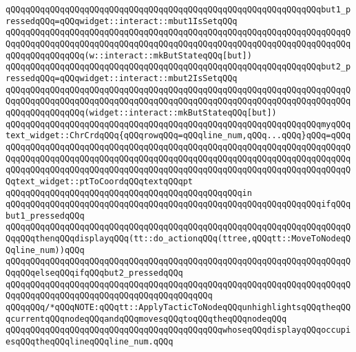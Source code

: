 \newline
\verb|qQQqqQQqqQQqqQQqqQQqqQQqqQQqqQQqqQQqqQQqqQQqqQQqqQQqqQQqqQQqqQQqbut1_pressedqQQq=qQQqwidget::interact::mbut1IsSetqQQq|\newline
\verb|qQQqqQQqqQQqqQQqqQQqqQQqqQQqqQQqqQQqqQQqqQQqqQQqqQQqqQQqqQQqqQQqqQQqqQQqqQQqqQQqqQQqqQQqqQQqqQQqqQQqqQQqqQQqqQQqqQQqqQQqqQQqqQQqqQQqqQQqqQQqqQQqqQQqqQQqqQQq(w::interact::mkButStateqQQq[but])|\newline
\newline
\verb|qQQqqQQqqQQqqQQqqQQqqQQqqQQqqQQqqQQqqQQqqQQqqQQqqQQqqQQqqQQqqQQqbut2_pressedqQQq=qQQqwidget::interact::mbut2IsSetqQQq|\newline
\verb|qQQqqQQqqQQqqQQqqQQqqQQqqQQqqQQqqQQqqQQqqQQqqQQqqQQqqQQqqQQqqQQqqQQqqQQqqQQqqQQqqQQqqQQqqQQqqQQqqQQqqQQqqQQqqQQqqQQqqQQqqQQqqQQqqQQqqQQqqQQqqQQqqQQqqQQqqQQq(widget::interact::mkButStateqQQq[but])|\newline
\newline
\verb|qQQqqQQqqQQqqQQqqQQqqQQqqQQqqQQqqQQqqQQqqQQqqQQqqQQqqQQqqQQqqQQqmyqQQqtext_widget::ChrCrdqQQq{qQQqrowqQQq=qQQqline_num,qQQq...qQQq}qQQq=qQQq|\newline
\verb|qQQqqQQqqQQqqQQqqQQqqQQqqQQqqQQqqQQqqQQqqQQqqQQqqQQqqQQqqQQqqQQqqQQqqQQqqQQqqQQqqQQqqQQqqQQqqQQqqQQqqQQqqQQqqQQqqQQqqQQqqQQqqQQqqQQqqQQqqQQqqQQqqQQqqQQqqQQqqQQqqQQqqQQqqQQqqQQqqQQqqQQqqQQqqQQqqQQqqQQqqQQqqQQqqQQqtext_widget::ptToCoordqQQqtextqQQqpt|\newline
\newline
\verb|qQQqqQQqqQQqqQQqqQQqqQQqqQQqqQQqqQQqqQQqqQQqqQQqin|\newline
\verb|qQQqqQQqqQQqqQQqqQQqqQQqqQQqqQQqqQQqqQQqqQQqqQQqqQQqqQQqqQQqqQQqifqQQqbut1_pressedqQQq|\newline
\verb|qQQqqQQqqQQqqQQqqQQqqQQqqQQqqQQqqQQqqQQqqQQqqQQqqQQqqQQqqQQqqQQqqQQqqQQqqQQqthenqQQqdisplayqQQq(tt::do_actionqQQq(ttree,qQQqtt::MoveToNodeqQQqline_num))qQQq|\newline
\verb|qQQqqQQqqQQqqQQqqQQqqQQqqQQqqQQqqQQqqQQqqQQqqQQqqQQqqQQqqQQqqQQqqQQqqQQqqQQqelseqQQqifqQQqbut2_pressedqQQq|\newline
\verb|qQQqqQQqqQQqqQQqqQQqqQQqqQQqqQQqqQQqqQQqqQQqqQQqqQQqqQQqqQQqqQQqqQQqqQQqqQQqqQQqqQQqqQQqqQQqqQQqqQQqqQQqqQQqqQQq|\newline
\verb|qQQqqQQq/*qQQqNOTE:qQQqtt::ApplyTacticToNodeqQQqunhighlightsqQQqtheqQQqcurrentqQQqnodeqQQqandqQQqmovesqQQqtoqQQqtheqQQqnodeqQQq|\newline
\verb|qQQqqQQqqQQqqQQqqQQqqQQqqQQqqQQqqQQqqQQqqQQqwhoseqQQqdisplayqQQqoccupiesqQQqtheqQQqlineqQQqline_num.qQQq|\newline
